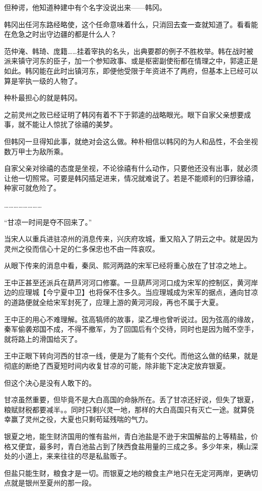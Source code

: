但种谔，他知道种建中有个名字没说出来——韩冈。

韩冈出任河东路经略使，这个任命意味着什么，只消回去查一查就知道了。看看能在危急之时出守边疆的都是什么人？

范仲淹、韩琦、庞籍……挂着宰执的名头，出典要郡的例子不胜枚举。韩在战时被派来镇守河东的臣子，加一个参知政事、或是枢密副使衔都在情理之中，郭逵正是如此。韩冈能在此时出镇河东，即便他受限于年资进不了两府，但基本上已经可以算是宰执一级的人物了。

种朴最担心的就是韩冈。

之前灵州之败已经证明了韩冈有着不下于郭逵的战略眼光。眼下自家父亲想要成事，就不能让人惊扰了徐禧的美梦。

但韩冈一旦得知此事，就绝对会这么做。种朴相信以韩冈的为人和品性，不会坐视数万甲士为敌所乘。

自家父亲对徐禧的态度是坐视，不论徐禧有什么动作，只要他还没有出事，就必须让他一切照常。可要是韩冈插足进来，情况就难说了。若是不能顺利的归罪徐禧，种家可就危险了。

……………………

“甘凉一时间是夺不回来了。”

当宋人以重兵进驻凉州的消息传来，兴庆府攻城，重又陷入了阴云之中。就是因为灵州之役而信心十足的仁多保忠也不由一阵哀叹。

从眼下传来的消息中看，秦凤、熙河两路的宋军已经将重心放在了甘凉之地上。

王中正甚至还派兵在葫芦河河口修寨。一旦葫芦河河口成为宋军的控制区，黄河岸边的应理城【今宁夏中卫】也将保不住多久。当应理城成为宋军的据点，通向甘凉的道路便就全给宋军封死了，应理上游的黄河河段，再也不属于大夏。

王中正的用心不难理解。弦高犒师的故事，梁乙埋也曾听说过。因为弦高的缘故，秦军偷袭郑国不成，不得不撤军，为了回国后有个交待，同时也是因为贼不空手，就将路上的滑国给灭了。

王中正眼下转向河西的甘凉一线，便是为了能有个交代。而他这么做的结果，就是彻底的断绝了西夏短时间内收复甘凉的可能，除非能下定决定放弃银夏。

但这个决心是没有人敢下的。

甘凉虽然重要，但毕竟不是大白高国的命脉所在。丢了甘凉还好说，但失了银夏，粮赋财税都要减半。。同时只剩兴灵一地，那样的大白高国只有灭亡一途。就算侥幸赢了灵州之役，大夏也只剩苟延残喘的气力。

银夏之地，能生财济国用的惟有盐州，青白池盐是不逊于宋国解盐的上等精盐，价格又便宜，最多时，青白池盐占到了陕西食盐用量的三成之多。多少年来，横山深处的小道上，来来往往的尽是私盐贩子。

但盐只能生财，粮食才是一切。而银夏之地的粮食主产地只在无定河两岸，更确切点就是银州至夏州的那一段。

